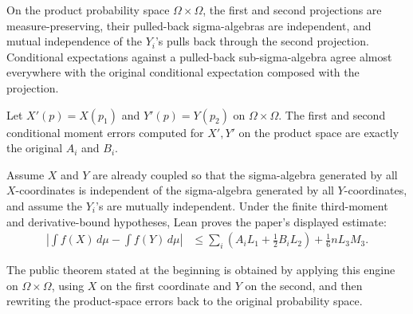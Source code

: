 \begin{lemma}\label{lem:product-transfer}
\leanok
On the product probability space \(\Omega\times\Omega\), the first and second
projections are measure-preserving, their pulled-back sigma-algebras are
independent, and mutual independence of the \(Y_i\)'s pulls back through the
second projection.  Conditional expectations against a pulled-back
sub-sigma-algebra agree almost everywhere with the original conditional
expectation composed with the projection.
\end{lemma}

\begin{lemma}\label{lem:error-transfer}
\leanok
Let \(X'(p)=X(p_1)\) and \(Y'(p)=Y(p_2)\) on \(\Omega\times\Omega\).  The
first and second conditional moment errors computed for \(X',Y'\) on the
product space are exactly the original \(A_i\) and \(B_i\).
\end{lemma}

\begin{theorem}\label{thm:independent-coupling}
\leanok
Assume \(X\) and \(Y\) are already coupled so that the sigma-algebra generated
by all \(X\)-coordinates is independent of the sigma-algebra generated by all
\(Y\)-coordinates, and assume the \(Y_i\)'s are mutually independent.  Under
the finite third-moment and derivative-bound hypotheses, Lean proves the
paper's displayed estimate:
\[
\begin{aligned}
  \left|\int f(X)\,d\mu-\int f(Y)\,d\mu\right|
  &\le
  \sum_i\left(A_iL_1+\frac12B_iL_2\right)
  +\frac16 nL_3M_3 .
\end{aligned}
\]
\end{theorem}
The public theorem stated at the beginning is obtained by applying this
engine on \(\Omega\times\Omega\), using \(X\) on the first coordinate and
\(Y\) on the second, and then rewriting the product-space errors back to the
original probability space.
